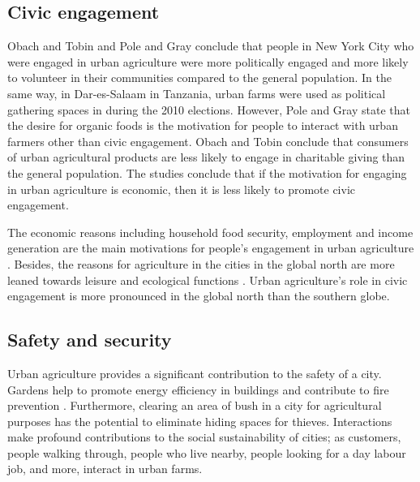 \subsection{Civic engagement}

Obach and Tobin \cite{Obach2014} and Pole and Gray \cite{Pole2013} conclude that people in New York City who were engaged in urban agriculture were more politically engaged and more likely to volunteer in their communities compared to the general population. In the same way, in Dar-es-Salaam in Tanzania, urban farms were used as political gathering spaces in during the 2010 elections. However, Pole and Gray \cite{Pole2013} state that the desire for organic foods is the motivation for people to interact with urban farmers other than civic engagement. Obach and Tobin \cite{Obach2014} conclude that consumers of urban agricultural products are less likely to engage in charitable giving than the general population. The studies conclude that if the motivation for engaging in urban agriculture is economic, then it is less likely to promote civic engagement.

The economic reasons including household food security, employment and income generation are the main motivations for people's engagement in urban agriculture \cite{Amponsah2016a, Kodjo2014, InternationalLabourOrganization2006, Zezza2010, Amoah2007}. Besides, the reasons for agriculture in the cities in the global north are more leaned towards leisure and ecological functions \cite{InternationalLabourOrganization2006, Hamilton2014}. Urban agriculture's role in civic engagement is more pronounced in the global north than the southern globe.

\subsection{Safety and security}

Urban agriculture provides a significant contribution to the safety of a city. Gardens help to promote energy efficiency in buildings and contribute to fire prevention \cite{Hoornweg2012}. Furthermore, clearing an area of bush in a city for agricultural purposes has the potential to eliminate hiding spaces for thieves. Interactions make profound contributions to the social sustainability of cities; as customers, people walking through, people who live nearby, people looking for a day labour job, and more, interact in urban farms.

